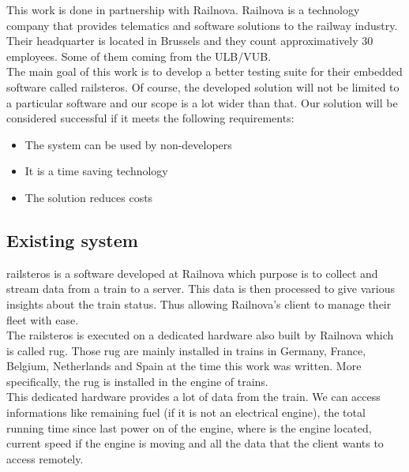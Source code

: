 \documentclass[12pt]{article}
\theoremstyle{definition}
\theoremstyle{definition}
\theoremstyle{remark}
\begin{document}

This work is done in partnership with Railnova. Railnova is a technology company that provides telematics and software solutions to the railway industry. Their headquarter is located in Brussels and they count approximatively 30 employees. Some of them coming from the ULB/VUB.\\

The main goal of this work is to develop a better testing suite for their embedded software called \gls{railsteros}. Of course, the developed solution will not be limited to a particular software and our scope is a lot wider than that. Our solution will be considered successful if it meets the following requirements:

\begin{itemize}
\item The system can be used by non-developers
\item It is a time saving technology
\item The solution reduces costs
\end{itemize}


\subsection{Existing system}

\gls{railsteros} is a software developed at Railnova which purpose is to collect and stream data from a train to a server. This data is then processed to give various insights about the train status. Thus allowing Railnova's client to manage their fleet with ease.\\

The \gls{railsteros} is executed on a dedicated hardware also built by Railnova which is called \gls{rug}. Those \gls{rug} are mainly installed in trains in Germany, France, Belgium, Netherlands and Spain at the time this work was written. More specifically, the \gls{rug} is installed in the engine of trains.\\

This dedicated hardware provides a lot of data from the train. We can access informations like remaining fuel (if it is not an electrical engine), the total running time since last power on of the engine, where is the engine located, current speed if the engine is moving and all the data that the client wants to access remotely.\\
\end{document}

